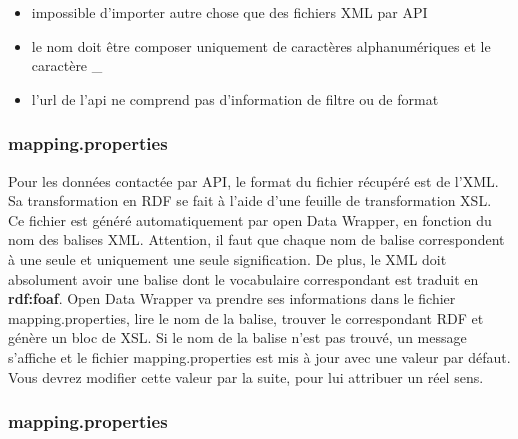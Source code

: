 \documentclass[a4paper]{article}
\begin{document}
\begin{itemize}
  \item impossible d'importer autre chose que des fichiers XML par API
  \item le nom doit être composer uniquement de caractères alphanumériques et le
  caractère \_
  \item l'url de l'api ne comprend pas d'information de filtre ou de format
\end{itemize}

\subsubsection{mapping.properties}

Pour les données contactée par API, le format du fichier récupéré est de l'XML.
Sa transformation en RDF se fait à l'aide d'une feuille de transformation XSL.
Ce fichier est généré automatiquement par open Data Wrapper, en fonction du nom
des balises XML. Attention, il faut que chaque nom de balise correspondent à une
seule et uniquement une seule signification. De plus, le XML doit absolument
avoir une balise dont le vocabulaire correspondant est traduit en
\textbf{rdf:foaf}. Open Data Wrapper va prendre ses informations dans le
fichier mapping.properties, lire le nom de la balise, trouver le correspondant
RDF et génère un bloc de XSL. Si le nom de la balise n'est pas trouvé, un
message s'affiche et le fichier mapping.properties est mis à jour avec une
valeur par défaut. Vous devrez modifier cette valeur par la suite, pour lui
attribuer un réel sens.

\subsubsection{mapping.properties}
\end{document}
